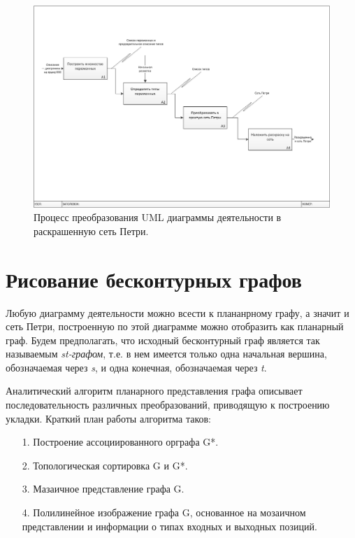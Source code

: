 \begin{figure}
	\begin{center}
		\includegraphics[width=\textwidth]{include/IDEF0ColouredPetri.png}
	\end{center}
	\caption{Процесс преобразования UML диаграммы деятельности в раскрашенную сеть Петри.}
	\label{fig:fig2}
\end{figure}

\section{Рисование бесконтурных графов}

Любую диаграмму деятельности можно всести к плананрному графу, а значит и сеть Петри, построенную по этой диаграмме можно отобразить как планарный граф. Будем предполагать, что исходный бесконтурный граф является так называемым \textit{st-графом}, т.е. в нем имеется только одна начальная вершина, обозначаемая через \textit{s}, и одна конечная, обозначаемая через \textit{t}.

Аналитический алгоритм планарного представления графа описывает последовательность различных преобразований, приводящую к построению укладки. \cite{Battista} Краткий план работы алгоритма таков:
\begin{enumerate}
\item[1.] Построение ассоциированного орграфа G*.
\item[2.] Топологическая сортировка G и G*.
\item[3.] Мазаичное представление графа G.
\item[4.] Полилинейное изображение графа G, основанное на мозаичном представлении и информации о типах входных и выходных позиций.
\end{enumerate}

